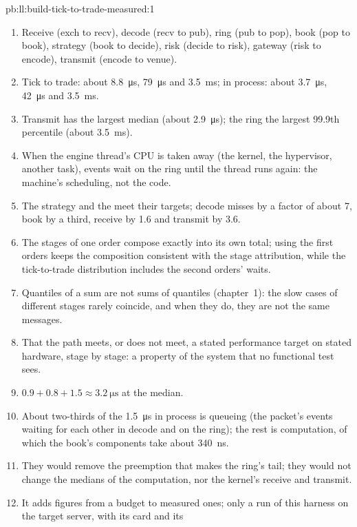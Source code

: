 \begin{solution}{pb:ll:build-tick-to-trade-measured:1}
\begin{enumerate}
\item Receive (exch to recv), decode (recv to pub), ring (pub to pop), book (pop to book), strategy (book to decide), risk (decide
to risk), gateway (risk to encode), transmit (encode to venue).
\item Tick to trade: about \qty{8.8}{\micro\second}, \qty{79}{\micro\second} and \qty{3.5}{\milli\second}; in process: about
\qty{3.7}{\micro\second}, \qty{42}{\micro\second} and \qty{3.5}{\milli\second}.
\item Transmit has the largest median (about \qty{2.9}{\micro\second}); the ring the largest 99.9th percentile (about
\qty{3.5}{\milli\second}).
\item When the engine thread's CPU is taken away (the kernel, the hypervisor, another task), events wait on the ring until the
thread runs again: the machine's scheduling, not the code.
\item The strategy and the  meet their targets; decode misses by a factor of about 7, book by a third, receive by 1.6 and
transmit by 3.6.
\item The stages of one order compose exactly into its own total; using the first orders keeps the composition consistent with
the stage attribution, while the tick-to-trade distribution includes the second orders' waits.
\item Quantiles of a sum are not sums of quantiles (chapter~1): the slow cases of different stages rarely coincide, and when
they do, they are not the same messages.
\item That the path meets, or does not meet, a stated performance target on stated hardware, stage by stage: a property of the
system that no functional test sees.
\item $0.9 + 0.8 + 1.5 \approx \qty{3.2}{\micro\second}$ at the median.
\item About two-thirds of the \qty{1.5}{\micro\second} in process is queueing (the packet's events waiting for each other in
decode and on the ring); the rest is computation, of which the book's components take about \qty{340}{\nano\second}.
\item They would remove the preemption that makes the ring's tail; they would not change the medians of the computation, nor the
kernel's receive and transmit.
\item It adds figures from a budget to measured ones; only a run of this harness on the target server, with its card and its

\end{enumerate}
\end{solution}
